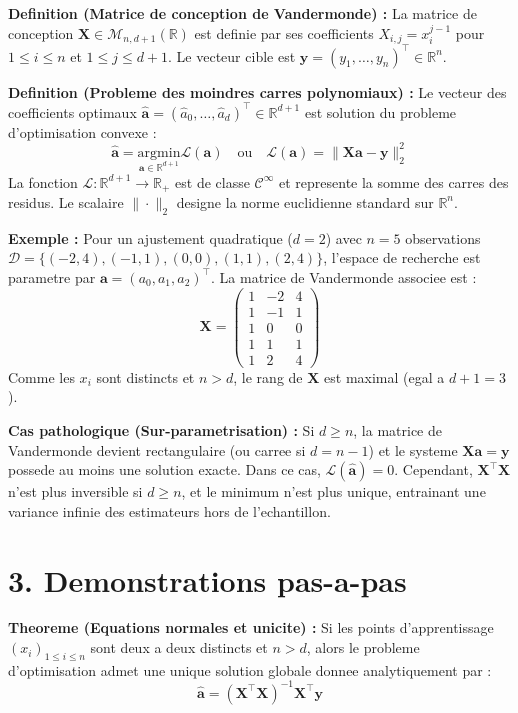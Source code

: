 \documentclass[11pt,a4paper]{report}
\begin{document}
\textbf{Definition (Matrice de conception de Vandermonde) :}
La matrice de conception $\mathbf{X} \in \mathcal{M}_{n, d+1}(\mathbb{R})$ est definie par ses coefficients $X_{i,j} = x_i^{j-1}$ pour $1 \le i \le n$ et $1 \le j \le d+1$. Le vecteur cible est $\mathbf{y} = (y_1, \dots, y_n)^\top \in \mathbb{R}^n$.

\textbf{Definition (Probleme des moindres carres polynomiaux) :}
Le vecteur des coefficients optimaux $\hat{\mathbf{a}} = (\hat{a}_0, \dots, \hat{a}_d)^\top \in \mathbb{R}^{d+1}$ est solution du probleme d'optimisation convexe :
$$ \hat{\mathbf{a}} = \underset{\mathbf{a} \in \mathbb{R}^{d+1}}{\text{argmin}} \mathcal{L}(\mathbf{a}) \quad \text{ou} \quad \mathcal{L}(\mathbf{a}) = \|\mathbf{X}\mathbf{a} - \mathbf{y}\|_2^2 $$
La fonction $\mathcal{L} : \mathbb{R}^{d+1} \to \mathbb{R}_+$ est de classe $\mathcal{C}^\infty$ et represente la somme des carres des residus. Le scalaire $\|\cdot\|_2$ designe la norme euclidienne standard sur $\mathbb{R}^n$.

\textbf{Exemple :}
Pour un ajustement quadratique ($d=2$) avec $n=5$ observations $\mathcal{D} = \{(-2, 4), (-1, 1), (0, 0), (1, 1), (2, 4)\}$, l'espace de recherche est parametre par $\mathbf{a} = (a_0, a_1, a_2)^\top$. La matrice de Vandermonde associee est :
$$ \mathbf{X} = \begin{pmatrix} 1 & -2 & 4 \\ 1 & -1 & 1 \\ 1 & 0 & 0 \\ 1 & 1 & 1 \\ 1 & 2 & 4 \end{pmatrix} $$
Comme les $x_i$ sont distincts et $n > d$, le rang de $\mathbf{X}$ est maximal (egal a $d+1=3$).

\textbf{Cas pathologique (Sur-parametrisation) :}
Si $d \ge n$, la matrice de Vandermonde devient rectangulaire (ou carree si $d = n-1$) et le systeme $\mathbf{X}\mathbf{a} = \mathbf{y}$ possede au moins une solution exacte. Dans ce cas, $\mathcal{L}(\hat{\mathbf{a}}) = 0$. Cependant, $\mathbf{X}^\top\mathbf{X}$ n'est plus inversible si $d \ge n$, et le minimum n'est plus unique, entrainant une variance infinie des estimateurs hors de l'echantillon.

\section{3. Demonstrations pas-a-pas}

\textbf{Theoreme (Equations normales et unicite) :}
Si les points d'apprentissage $(x_i)_{1 \le i \le n}$ sont deux a deux distincts et $n > d$, alors le probleme d'optimisation admet une unique solution globale donnee analytiquement par :
$$ \hat{\mathbf{a}} = (\mathbf{X}^\top\mathbf{X})^{-1}\mathbf{X}^\top\mathbf{y} $$
\end{document}
